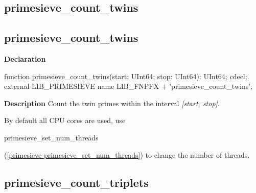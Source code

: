 \documentclass{report}
\newif\ifpdf
\begin{document}
\subsection*{\large{\textbf{primesieve{\_}count{\_}twins}}\normalsize\hspace{1ex}\hrulefill}
\else
\subsection*{primesieve{\_}count{\_}twins}
\fi
\label{primesieve-primesieve_count_twins}
\begin{list}{}{
\setlength{\itemindent}{0cm}
\setlength{\listparindent}{0cm}
\setlength{\leftmargin}{\evensidemargin}
\addtolength{\leftmargin}{\tmplength}
\settowidth{\labelsep}{X}
\addtolength{\leftmargin}{\labelsep}
\setlength{\labelwidth}{\tmplength}
}
\item[\textbf{Declaration}\hfill]
\ifpdf
\begin{flushleft}
\fi
\begin{ttfamily}
function primesieve{\_}count{\_}twins(start: UInt64; stop: UInt64): UInt64; cdecl; external LIB{\_}PRIMESIEVE name LIB{\_}FNPFX + 'primesieve{\_}count{\_}twins';\end{ttfamily}

\ifpdf
\end{flushleft}
\fi

\par
\item[\textbf{Description}]
Count the twin primes within the interval \textit{[start, stop]}.

By default all CPU cores are used, use \begin{ttfamily}primesieve{\_}set{\_}num{\_}threads\end{ttfamily}(\ref{primesieve-primesieve_set_num_threads}) to change the number of threads.

\end{list}
\ifpdf
\subsection*{\large{\textbf{primesieve{\_}count{\_}triplets}}\normalsize\hspace{1ex}\hrulefill}
\else
\end{document}
